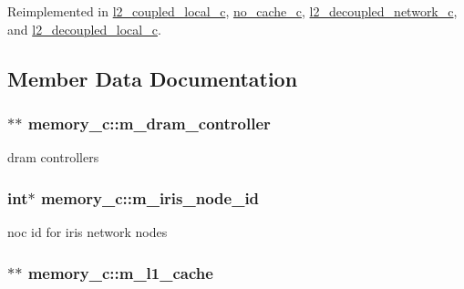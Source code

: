 Reimplemented in \hyperlink{classl2__coupled__local__c_a4f3ca72f4a2ee33fa7f8b97b21e72364}{l2\_\-coupled\_\-local\_\-c}, \hyperlink{classno__cache__c_aec1175eba0781322b067d5fa906391ed}{no\_\-cache\_\-c}, \hyperlink{classl2__decoupled__network__c_aea63c8492607041d4d3ab90c8fa2961e}{l2\_\-decoupled\_\-network\_\-c}, and \hyperlink{classl2__decoupled__local__c_a4c319b02982447d98079bf6649fa5c15}{l2\_\-decoupled\_\-local\_\-c}.



\subsection{Member Data Documentation}
\hypertarget{classmemory__c_a7372570a1fb983f16253261193a052bf}{
\subsubsection[{m\_\-dram\_\-controller}]{$\ast$$\ast$ {\bf memory\_\-c::m\_\-dram\_\-controller}}}
\label{classmemory__c_a7372570a1fb983f16253261193a052bf}
dram controllers \hypertarget{classmemory__c_ad2743072864011245a46ee7038df5ae8}{
\subsubsection[{m\_\-iris\_\-node\_\-id}]{\setlength{\rightskip}{0pt plus 5cm}int$\ast$ {\bf memory\_\-c::m\_\-iris\_\-node\_\-id}}}
\label{classmemory__c_ad2743072864011245a46ee7038df5ae8}
noc id for iris network nodes \hypertarget{classmemory__c_a0bfafc54e9761b2ea991e668efb274c2}{
\subsubsection[{m\_\-l1\_\-cache}]{$\ast$$\ast$ {\bf memory\_\-c::m\_\-l1\_\-cache}}}
